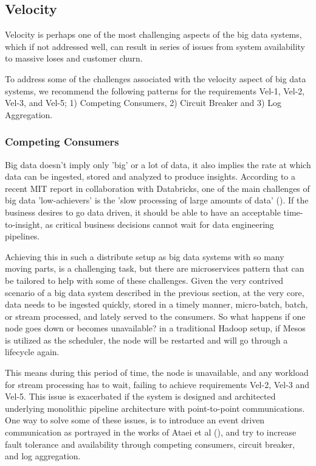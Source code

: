 \documentclass[conference]{IEEEtran}
\begin{document}
\subsection{Velocity}

Velocity is perhaps one of the most challenging aspects of the big data systems, which if not addressed well, can result in series of issues from system availability to massive loses and customer churn. 

To address some of the challenges associated with the velocity aspect of big data systems, we recommend the following patterns for the requirements Vel-1, Vel-2, Vel-3, and Vel-5; 1) Competing Consumers, 2) Circuit Breaker and 3) Log Aggregation.

\subsubsection{Competing Consumers}

Big data doesn't imply only 'big' or a lot of data, it also implies the rate at which data can be ingested, stored and analyzed to produce insights. According to a recent MIT report in collaboration with Databricks, one of the main challenges of big data 'low-achievers' is the 'slow processing of large amounts of data' (\cite{DataBricksSurvey}). If the business desires to go data driven, it should be able to have an acceptable time-to-insight, as critical business decisions cannot wait for data engineering pipelines. 

Achieving this in such a distribute setup as big data systems with so many moving parts, is a challenging task, but there are microservices pattern that can be tailored to help with some of these challenges. Given the very contrived scenario of a big data system described in the previous section, at the very core, data needs to be ingested quickly, stored in a timely manner, micro-batch, batch, or stream processed, and lately served to the consumers. So what happens if one node goes down or becomes unavailable? in a traditional Hadoop setup, if Mesos is utilized as the scheduler, the node will be restarted and will go through a lifecycle again. 

This means during this period of time, the node is unavailable, and any workload for stream processing has to wait, failing to achieve requirements Vel-2, Vel-3 and Vel-5. This issue is exacerbated if the system is designed and architected underlying monolithic pipeline architecture with point-to-point communications. One way to solve some of these issues, is to introduce an event driven communication as portrayed in the works of Ataei et al (\cite{ataei2021neomycelia}), and try to increase fault tolerance and availability through competing consumers, circuit breaker, and log aggregation. 
\end{document}
